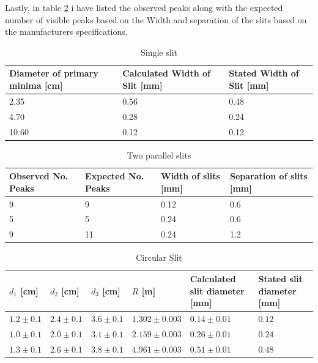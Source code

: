 \documentclass[11pt,a4paper]{article}
\begin{document}
    Lastly, in table \ref{tab:paraslit} i have listed the observed peaks along with the expected number of visible peaks based on the Width and separation of the slits based on the manufacturers specifications.

    \begin{table}[H]
        \center
        \caption{Single slit}
         \begin{tabular}{l l l}
            Diameter of primary minima [cm] & Calculated Width of Slit [mm] & Stated Width of Slit [mm] \\ \hline
            2.35 & 0.56 & 0.48 \\ 
            4.70 & 0.28 & 0.24 \\
            10.60 & 0.12 & 0.12
         \end{tabular}
         \label{tab:singleslit}
    \end{table}

    \begin{table}[H]
        \center
        \caption{Two parallel slits}
         \begin{tabular}{l l l l}
            Observed No. Peaks & Expected No. Peaks & Width of slits [mm] & Separation of slits [mm] \\ \hline
            9 & 9 & 0.12 & 0.6 \\
            5 & 5 & 0.24 & 0.6 \\
            9 & 11 & 0.24 & 1.2 
         \end{tabular}
         \label{tab:paraslit}
    \end{table}

    \begin{table}[H]
        \center
        \caption{Circular Slit}
         \begin{tabular}{l l l l l l}
            $d_1$ [cm] & $d_2$ [cm] & $d_3$ [cm] & $R$ [m] & Calculated slit diameter [mm] & Stated slit diameter [mm] \\ \hline
            $1.2 \pm 0.1$ & $2.4 \pm 0.1$ & $3.6 \pm 0.1$ & $1.302 \pm  0.003$ & $0.14 \pm 0.01$ & $0.12$ \\ 
            $1.0 \pm 0.1$ & $2.0 \pm 0.1$ & $3.1 \pm 0.1$ & $2.159 \pm  0.003$ & $0.26 \pm 0.01$ & $0.24$ \\ 
            $1.3 \pm 0.1$ & $2.6 \pm 0.1$ & $3.8 \pm 0.1$ & $4.961 \pm  0.003$ & $0.51 \pm 0.01$ & $0.48$ \\ 
         \end{tabular}
         \label{tab:circslit}
    \end{table}
\end{document}
